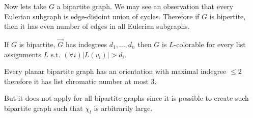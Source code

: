 Now lets take $G$ a bipartite graph. We may see an observation that every Eulerian subgraph is edge-disjoint union of cycles. Therefore if $G$ is bipertite, then it has even number of edges in all Eulerian subgraphs.

\begin{cor}
	If $G$ is bipartite, $\overrightarrow{G}$ has indegrees $d_{1}, \dots, d_{n}$ then $G$ is $L$-colorable for every list assignments $L$ s.t. $(\forall i) |L(v_{i})| > d_{i}$.
\end{cor}

\begin{observ}
	Every planar bipartite graph has an orientation with maximal indegree $\leq 2$ therefore it has list chromatic number at most 3.
\end{observ}

But it does not apply for all bipartite graphs since it is possible to create such bipartite graph such that $\chi_{l}$ is arbitrarily large.